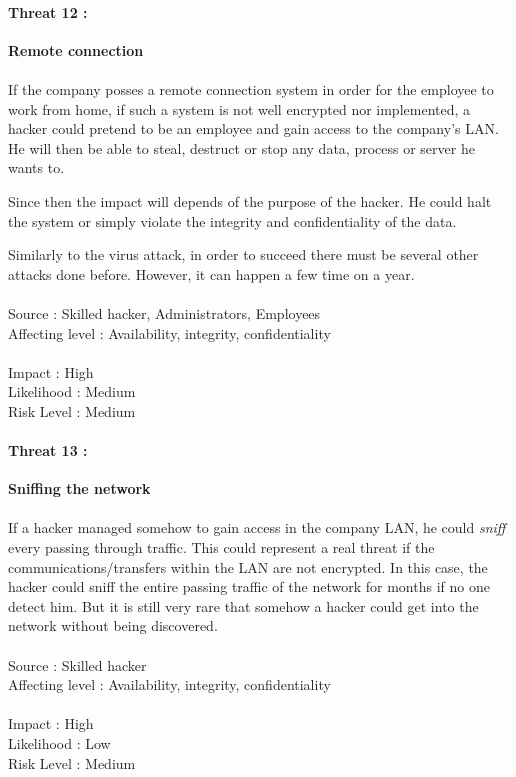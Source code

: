\documentclass[a4paper,10pt]{article}
\begin{document}
\paragraph{Threat 12 :}  \textbf{Remote connection} 
\paragraph{}If the company posses a remote connection system in order for the employee to work from home, if such a system is not well encrypted nor implemented, a hacker could pretend to be an employee and gain access to the company's LAN. He will then be able to steal, destruct or stop any data, process or server he wants to.

Since then the impact will depends of the purpose of the hacker. He could halt the system or simply violate the integrity and confidentiality of the data. 

Similarly to the virus attack, in order to succeed there must be several other attacks done before. However, it can happen a few time on a year.  \\ \\ 
Source : Skilled hacker, Administrators, Employees \\ 
Affecting level : Availability, integrity, confidentiality \\ \\
Impact : High \\
Likelihood : Medium \\
Risk Level : Medium

\paragraph{Threat 13 :}  \textbf{Sniffing the network}
\paragraph{}If a hacker managed somehow to gain access in the company LAN, he could \emph{sniff} every passing through traffic. This could represent a real threat if the communications/transfers within the LAN are not encrypted. In this case, the hacker could sniff the entire passing traffic of the network for months if no one detect him. But it is still very rare that somehow a hacker could get into the network without being discovered.\\  \\ 
Source : Skilled hacker \\ 
Affecting level : Availability, integrity, confidentiality \\ \\
Impact : High \\
Likelihood : Low \\
Risk Level : Medium
\end{document}
